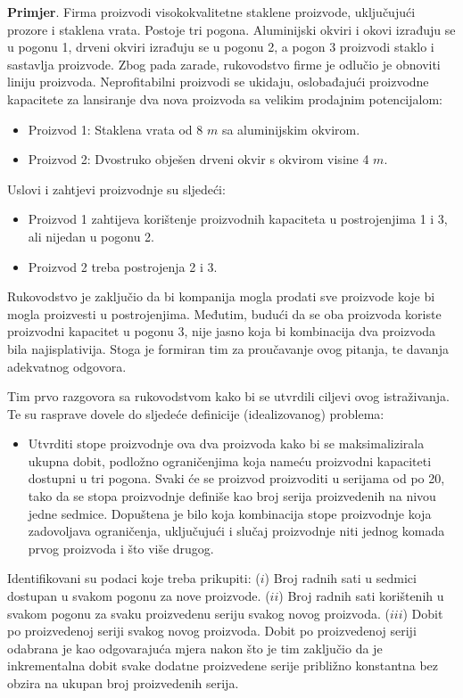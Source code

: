 \documentclass[a4paper, utf8, 11pt, colorlinks]{book}
\begin{document}
\textbf{Primjer}. %
Firma proizvodi visokokvalitetne staklene proizvode, uključujući prozore i staklena vrata. Postoje tri pogona. Aluminijski okviri i okovi izrađuju se u pogonu 1, drveni okviri izrađuju se u pogonu 2, a pogon 3 proizvodi staklo i sastavlja proizvode.
Zbog pada zarade, rukovodstvo firme je odlučio je obnoviti liniju proizvoda. Neprofitabilni proizvodi se ukidaju, oslobađajući proizvodne kapacitete za lansiranje dva nova proizvoda sa velikim prodajnim potencijalom:
\begin{itemize}
    \item Proizvod 1: Staklena vrata od 8 $m$ sa aluminijskim okvirom.
    \item Proizvod 2: Dvostruko obješen drveni okvir s okvirom visine 4 $m$.
\end{itemize}
Uslovi i zahtjevi proizvodnje su sljedeći:
\begin{itemize}
    \item Proizvod 1 zahtijeva   korištenje proizvodnih kapaciteta u postrojenjima 1 i 3, ali nijedan u pogonu 2. 
    \item Proizvod 2 treba   postrojenja 2 i 3. 
\end{itemize}
    Rukovodstvo je zaključio da bi kompanija mogla prodati sve proizvode koje bi mogla proizvesti u postrojenjima. Međutim, budući da se oba proizvoda koriste proizvodni kapacitet u pogonu 3, nije jasno koja bi kombinacija dva proizvoda bila najisplativija. Stoga je formiran tim za proučavanje ovog pitanja, te davanja adekvatnog odgovora.

Tim prvo razgovora sa rukovodstvom kako bi se utvrdili ciljevi ovog istraživanja. Te su rasprave dovele do sljedeće definicije (idealizovanog) problema:
\begin{itemize}
    \item Utvrditi  stope proizvodnje  ova dva proizvoda kako bi se maksimalizirala ukupna dobit, podložno ograničenjima koja nameću   proizvodni kapaciteti dostupni u tri pogona. Svaki će se proizvod proizvoditi u serijama od po 20, tako da se stopa proizvodnje definiše kao broj serija proizvedenih na nivou jedne sedmice. Dopuštena je bilo koja kombinacija stope proizvodnje koja zadovoljava   ograničenja, uključujući i slučaj proizvodnje niti jednog komada prvog proizvoda i što  više   drugog. 
\end{itemize}

Identifikovani su podaci koje treba prikupiti: 
($i$) Broj radnih sati u sedmici dostupan u svakom pogonu za nove proizvode.  
($ii$) Broj radnih sati korištenih u svakom pogonu za svaku proizvedenu seriju svakog novog proizvoda.
($iii$) Dobit po proizvedenoj seriji svakog novog proizvoda. Dobit po proizvedenoj seriji odabrana je kao odgovarajuća mjera nakon što je tim zaključio da je inkrementalna dobit svake dodatne proizvedene serije   približno konstantna bez obzira na ukupan broj proizvedenih serija.
\end{document}
